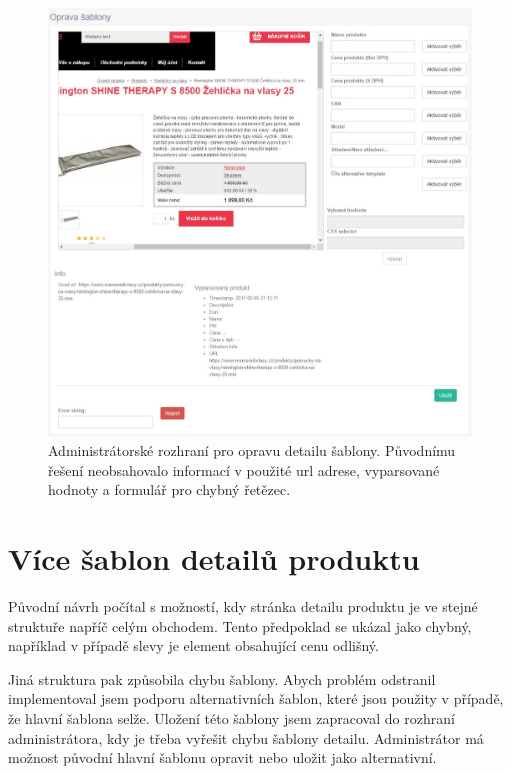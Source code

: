 \documentclass[thesis=B,czech]{FITthesis}[2012/06/26]
\begin{document}
\begin{figure}\centering
 	\includegraphics[width=1.0\textwidth]{resources/template-detail-err}
	\caption[Administrátorské rozhraní pro opravu detailu šablony]{Administrátorské rozhraní pro opravu detailu šablony.
	Původnímu řešení neobsahovalo informací v použité url adrese, vyparsované hodnoty a formulář pro chybný řetězec.}\label{fig:temp-det-err}
\end{figure}

\section{Více šablon detailů produktu}
Původní návrh počítal s možností, kdy stránka detailu produktu je ve stejné struktuře napříč celým obchodem.
Tento předpoklad se ukázal jako chybný, například v případě slevy je element obsahující cenu odlišný.
\par
Jiná struktura pak způsobila chybu šablony. Abych problém odstranil implementoval jsem podporu alternativních šablon, které jsou
použity v případě, že hlavní šablona selže. Uložení této šablony jsem zapracoval do rozhraní administrátora, kdy je třeba
vyřešit chybu šablony detailu. Administrátor má možnost původní hlavní šablonu opravit nebo uložit jako alternativní.
\end{document}
